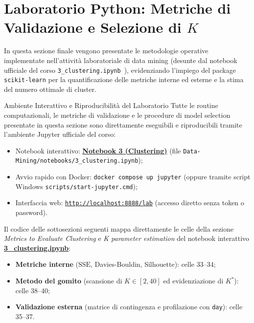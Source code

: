 \section{Laboratorio Python: Metriche di Validazione e Selezione di \texorpdfstring{$K$}{K}}
\label{sec:dm-python-lab}

In questa sezione finale vengono presentate le metodologie operative implementate nell'attività laboratoriale di data mining (desunte dal notebook ufficiale del corso \texttt{3\_clustering.ipynb}~\cite{tan2018}), evidenziando l'impiego del package \texttt{scikit-learn} per la quantificazione delle metriche interne ed esterne e la stima del numero ottimale di cluster.

\begin{noteblock}{Ambiente Interattivo e Riproducibilità del Laboratorio}
    Tutte le routine computazionali, le metriche di validazione e le procedure di model selection presentate in questa sezione sono direttamente eseguibili e riproducibili tramite l'ambiente Jupyter ufficiale del corso:
    \begin{itemize}[noitemsep]
        \item Notebook interattivo: \href{http://localhost:8888/lab/tree/notebooks/3_clustering.ipynb}{\textbf{Notebook 3 (Clustering)}} (file \texttt{Data-Mining/notebooks/3\_clustering.ipynb});
        \item Avvio rapido con Docker: \texttt{docker compose up jupyter} (oppure tramite script Windows \texttt{scripts/start-jupyter.cmd});
        \item Interfaccia web: \href{http://localhost:8888/lab}{\texttt{http://localhost:8888/lab}} (accesso diretto senza token o password).
    \end{itemize}
\end{noteblock}

\begin{remark}
    Il codice delle sottosezioni seguenti mappa direttamente le celle della sezione \textit{Metrics to Evaluate Clustering} e \textit{K parameter estimation} del notebook interattivo \href{http://localhost:8888/lab/tree/notebooks/3_clustering.ipynb}{\textbf{3\_clustering.ipynb}}:
    \begin{itemize}[noitemsep]
        \item \textbf{Metriche interne} ($\mathrm{SSE}$, Davies-Bouldin, Silhouette): celle 33--34;
        \item \textbf{Metodo del gomito} (scansione di $K \in [2, 40]$ ed evidenziazione di $K^*$): celle 38--40;
        \item \textbf{Validazione esterna} (matrice di contingenza e profilazione con \texttt{day}): celle 35--37.
    \end{itemize}
\end{remark}

